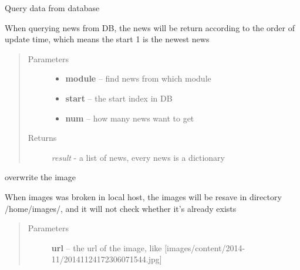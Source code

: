 \documentclass[letterpaper,10pt,english]{sphinxmanual}
\begin{document}

\begin{fulllineitems}
\label{sysunews:sysunews.db_module.get_news}
Query data from database

When querying news from DB, the news will be return according to the order of update time, which means the start 1 is the newest news
\begin{quote}\begin{description}
\item[{Parameters}] \leavevmode\begin{itemize}
\item {} 
\textbf{module} -- find news from which module

\item {} 
\textbf{start} -- the start index in DB

\item {} 
\textbf{num} -- how many news want to get

\end{itemize}

\item[{Returns}] \leavevmode
\emph{result} - a list of news, every news is a dictionary

\end{description}\end{quote}

\end{fulllineitems}


\begin{fulllineitems}
\label{sysunews:sysunews.db_module.resave_img}
overwrite the image

When images was broken in local host, the images will be resave in directory /home/images/, and it will not check whether it's already exists
\begin{quote}\begin{description}
\item[{Parameters}] \leavevmode
\textbf{url} -- the url of the image, like {[}images/content/2014-11/20141124172306071544.jpg{]}

\end{description}\end{quote}

\end{fulllineitems}
\end{document}
